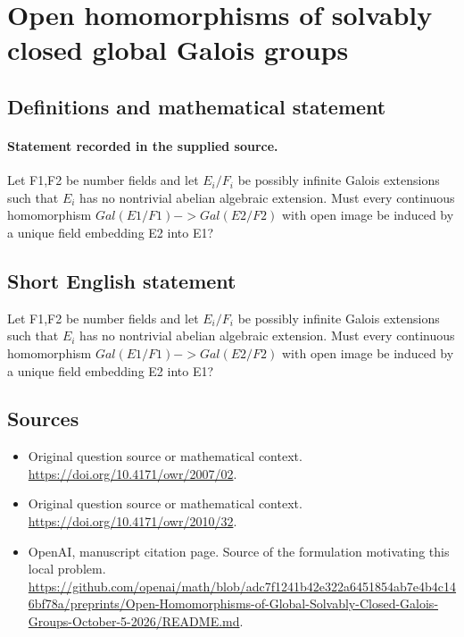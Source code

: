 \documentclass[11pt]{article}
\begin{document}
\section*{Open homomorphisms of solvably closed global Galois groups}\label{30007284}
\subsection{Definitions and mathematical statement}
\paragraph{Statement recorded in the supplied source.}
Let F1,F2 be number fields and let $E_i/F_i$ be possibly infinite Galois extensions such that $E_i$ has no nontrivial abelian algebraic extension. Must every continuous homomorphism $Gal(E1/F1)->Gal(E2/F2)$ with open image be induced by a unique field embedding E2 into E1?
\subsection{Short English statement}
Let F1,F2 be number fields and let $E_i/F_i$ be possibly infinite Galois extensions such that $E_i$ has no nontrivial abelian algebraic extension. Must every continuous homomorphism $Gal(E1/F1)->Gal(E2/F2)$ with open image be induced by a unique field embedding E2 into E1?
\subsection{Sources}
\begin{itemize}
\item[S1] Original question source or mathematical context.
\url{https://doi.org/10.4171/owr/2007/02}.
\item[S2] Original question source or mathematical context.
\url{https://doi.org/10.4171/owr/2010/32}.
\item[S3] OpenAI, manuscript citation page. Source of the formulation motivating this local problem.
\url{https://github.com/openai/math/blob/adc7f1241b42e322a6451854ab7e4b4c146bf78a/preprints/Open-Homomorphisms-of-Global-Solvably-Closed-Galois-Groups-October-5-2026/README.md}.
\end{itemize}
\end{document}
